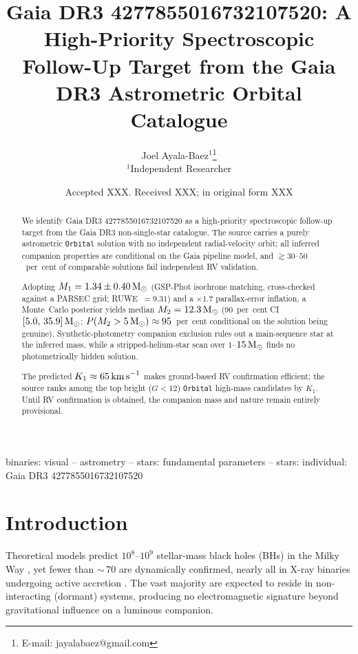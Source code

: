 \documentclass[usenatbib,fleqn]{mnras}
\title[Gaia DR3 4277855016732107520: Spectroscopic Follow-Up Target]
{Gaia DR3 4277855016732107520: A High-Priority Spectroscopic\\
 Follow-Up Target from the Gaia DR3 Astrometric Orbital Catalogue}
\author[J. Ayala-Baez]{
  Joel Ayala-Baez$^{1}$\thanks{E-mail: jayalabaez@gmail.com}\\
  $^{1}$Independent Researcher
}
\date{Accepted XXX. Received XXX; in original form XXX}
\newcommand{\Msun}{{\rm M}_\odot}
\newcommand{\kms}{{\rm km\,s}^{-1}}
\begin{document}
\label{firstpage}
\pagerange{\pageref{firstpage}--\pageref{LastPage}}
\maketitle

\begin{abstract}
We identify Gaia DR3 4277855016732107520 as a high-priority
spectroscopic follow-up target from the Gaia DR3 non-single-star
catalogue.  The source carries a purely astrometric
\texttt{Orbital} solution with no independent radial-velocity
orbit; all inferred companion properties are conditional on the
Gaia pipeline model, and $\gtrsim 30$--$50$~per~cent of comparable
solutions fail independent RV validation.

Adopting $M_1 = 1.34 \pm 0.40\,\Msun$ (GSP-Phot isochrone
matching, cross-checked against a PARSEC grid;
RUWE~$= 9.31$) and a $\times 1.7$ parallax-error
inflation, a Monte~Carlo posterior yields median
$M_2 = 12.3\,\Msun$ (90~per~cent CI $[5.0,\,35.9]\,\Msun$;
$P(M_2 > 5\,\Msun) \approx 95$~per~cent conditional on the
solution being genuine).  Synthetic-photometry
companion exclusion rules out a main-sequence star at the
inferred mass, while a stripped-helium-star scan over
$1$--$15\,\Msun$ finds no photometrically hidden solution.

The predicted $K_1 \approx 65\,\kms$ makes ground-based RV
confirmation efficient; the source ranks among the top
bright ($G < 12$) \texttt{Orbital} high-mass candidates by $K_1$.
Until RV confirmation is obtained, the companion mass and
nature remain entirely provisional.
\end{abstract}

\begin{keywords}
binaries: visual -- astrometry -- stars: fundamental parameters --
stars: individual: Gaia DR3 4277855016732107520
\end{keywords}

\section{Introduction}
\label{sec:intro}

Theoretical models predict $10^8$--$10^9$ stellar-mass black holes
(BHs) in the Milky Way \citep{AgolKamionkowski2002, Shapiro1983},
yet fewer than $\sim$\,70 are dynamically confirmed, nearly all in
X-ray binaries undergoing active accretion
\citep{RemillardMcClintock2006}.  The vast majority are expected to
reside in non-interacting (dormant) systems, producing no
electromagnetic signature beyond gravitational influence on a
luminous companion.
\end{document}
